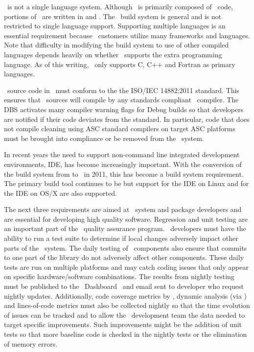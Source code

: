 \draco\ is not a single language system.  Although \draco\ is
primarily composed of \cpp\ code, portions of \draco\ are written in
 and  .  The \draco\ build system
is general and is not restricted to single language support.
Supporting multiple languages is an essential requirement because
\draco\ customers utilize many frameworks and languages.  Note that
difficulty in modifying the build system to use of other compiled
languages depends heavily on whether \cmake\ supports the extra
programming language.  As of this writing, \cmake\ only supports C,
C++ and Fortran as primary languages.

\cpp\ source code in \draco\ must conform to the the ISO/IEC
14882:2011 standard.  This ensures that
\cpp\ sources will compile by any standards compliant \cpp\ compiler.
The DBS activates many compiler warning flags for Debug builds so that
developers are notified if their code deviates from the standard.  In
particular, code that does not compile cleaning using ASC standard
compilers on target ASC platforms must be brought into compliance or
be removed from the \draco\ system.

In recent years the need to support non-command line integrated development environments,  IDE, has become increasingly important.  With the conversion of the build system from  to \cmake\ in 2011, this has become a build system requirement.  The primary build tool continues to be  but support for the  IDE on Linux and for the  IDE on OS/X are also supported.

The next three requirements are aimed at \draco\ system and package
developers and are essential for developing high quality software.
Regression and unit testing are an important part of the \draco\ quality assurance program.  \draco\ developers must have the ability to run a test suite to determine if local changes adversely impact other parts of the \draco\ system.  The daily
testing of \draco\ components also ensure that commits to
one part of the library do not adversely affect other components.  These daily tests are run on multiple platforms and may catch coding issues that only appear on specific hardware/software combinations.  The results from nightly testing must be published to the \draco\ Dashboard~\cite{codercdash}  and email sent to developer who request nightly updates.  Additionally, code coverage metrics by \bullseye {}, dynamic analysis (via \valgrind)  and lines-of-code metrics  must also be collected nightly so that the time evolution of issues can be tracked and to allow the \draco\ development team the data needed to target specific improvements.  Such improvements might be the addition of unit tests so that more baseline code is checked in the nightly tests or the elimination of memory errors.

